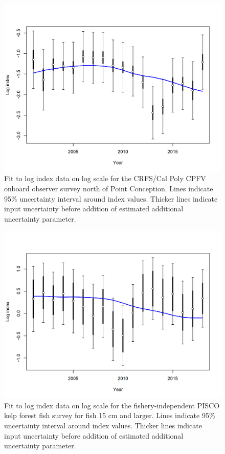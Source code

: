 \documentclass[12pt,]{article}
\begin{document}
\FloatBarrier 

\begin{figure}
\centering
\includegraphics{r4ss/plots_mod1/index5_logcpuefit_RecOnboardNorth.png}
\caption{Fit to log index data on log scale for the CRFS/Cal Poly CPFV
onboard observer survey north of Point Conception. Lines indicate 95\%
uncertainty interval around index values. Thicker lines indicate input
uncertainty before addition of estimated additional uncertainty
parameter. \label{fig:index5_logcpuefit_RecOnboardNorth}}
\end{figure}

\FloatBarrier

\begin{figure}
\centering
\includegraphics{r4ss/plots_mod1/index5_logcpuefit_PISCO.png}
\caption{Fit to log index data on log scale for the fishery-independent
PISCO kelp forest fish survey for fish 15 cm and larger. Lines indicate
95\% uncertainty interval around index values. Thicker lines indicate
input uncertainty before addition of estimated additional uncertainty
parameter. \label{fig:index5_logcpuefit_PISCO}}
\end{figure}
\end{document}
